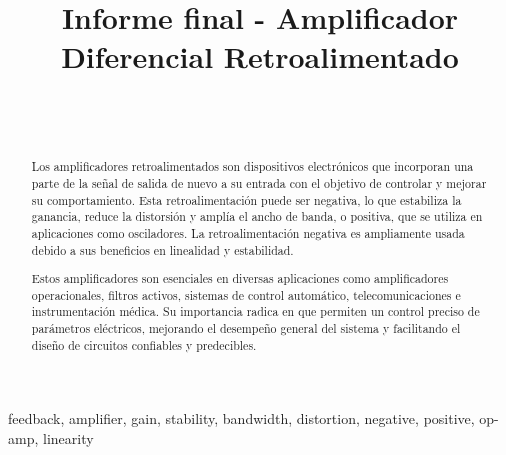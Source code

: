 \documentclass[conference]{IEEEtran}
\begin{document}
	
	\title{Informe final - Amplificador Diferencial Retroalimentado}
	\author{
		\\
		\\[1ex]
		
		\and
	}
	\maketitle
	
	
	\begin{abstract}
		Los amplificadores retroalimentados son dispositivos electrónicos que incorporan una parte de la señal de salida de nuevo a su entrada con el objetivo de controlar y mejorar su comportamiento. Esta retroalimentación puede ser negativa, lo que estabiliza la ganancia, reduce la distorsión y amplía el ancho de banda, o positiva, que se utiliza en aplicaciones como osciladores. La retroalimentación negativa es ampliamente usada debido a sus beneficios en linealidad y estabilidad.
		
		Estos amplificadores son esenciales en diversas aplicaciones como amplificadores operacionales, filtros activos, sistemas de control automático, telecomunicaciones e instrumentación médica. Su importancia radica en que permiten un control preciso de parámetros eléctricos, mejorando el desempeño general del sistema y facilitando el diseño de circuitos confiables y predecibles.
	\end{abstract}
	
	\begin{IEEEkeywords}
		feedback, amplifier, gain, stability, bandwidth, distortion, negative, positive, op-amp, linearity
	\end{IEEEkeywords}
	
	
	
	
	
\end{document}
